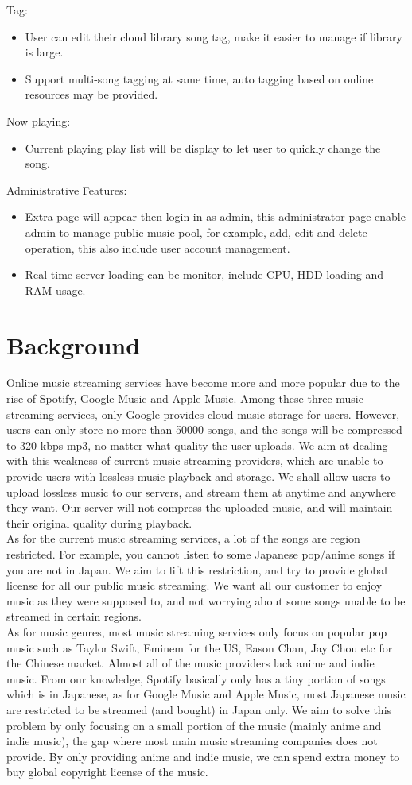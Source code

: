 \documentclass[12pt, a4paper, oneside]{article}
\newcommand{\env}[2]{\begin{#1}#2\end{#1}}
\begin{document}
\noindent Tag: \env{itemize} {
\item User can edit their cloud library song tag, make it easier to manage if library is large.
\item Support multi-song tagging at same time, auto tagging based on online resources may be provided.
}

\noindent Now playing: \env{itemize} {
\item Current playing play list will be display to let user to quickly change the song.
}

\noindent Administrative Features: \env{itemize} {
\item Extra page will appear then login in as admin, this administrator page enable admin to
    manage public music pool, for example, add, edit and delete operation,
    this also include user account management.
\item Real time server loading can be monitor, include CPU, HDD loading and RAM usage.
}

\newpage
\section{Background}
Online music streaming services have become more and more popular due to the rise of Spotify,
Google Music and Apple Music. Among these three music streaming services, only Google provides
cloud music storage for users. However, users can only store no more than 50000 songs, and the
songs will be compressed to 320 kbps mp3, no matter what quality the user uploads. We aim at
dealing with this weakness of current music streaming providers, which are unable to provide users
with lossless music playback and storage. We shall allow users to upload lossless music to our
servers, and stream them at anytime and anywhere they want. Our server will not compress the
uploaded music, and will maintain their original quality during playback.\\

As for the current music streaming services, a lot of the songs are region restricted.
For example, you cannot listen to some Japanese pop/anime songs if you are not in Japan.
We aim to lift this restriction, and try to provide global license for all our public music
streaming. We want all our customer to enjoy music as they were supposed to, and not worrying
about some songs unable to be streamed in certain regions.\\

As for music genres, most music streaming services only focus on popular pop music such as
Taylor Swift, Eminem for the US, Eason Chan, Jay Chou etc for the Chinese market. Almost all
of the music providers lack anime and indie music. From our knowledge, Spotify basically only
has a tiny portion of songs which is in Japanese, as for Google Music and Apple Music, most
Japanese music are restricted to be streamed (and bought) in Japan only. We aim to solve this
problem by only focusing on a small portion of the music (mainly anime and indie music), the gap
where most main music streaming companies does not provide. By only providing anime and indie
music, we can spend extra money to buy global copyright license of the music.\\
\end{document}
